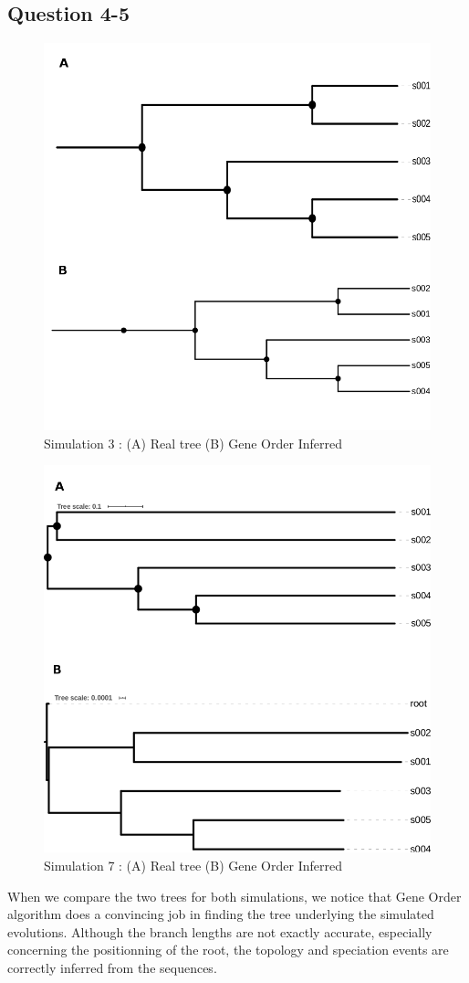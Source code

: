 \documentclass[]{article}
\theoremstyle{definition}
\begin{document}
\newpage
\subsection{Question 4-5}

\begin{figure}[h]
	\centering
	\includegraphics*[width = 0.5\linewidth]{image/new/tree3.png}
	\caption{ Simulation 3 :  (A) Real tree (B) Gene Order Inferred }
\end{figure}

\begin{figure}[h]
	\centering
	\includegraphics*[width = 0.5\linewidth]{image/new/tree7.png}
	\caption{ Simulation 7 :  (A) Real tree (B) Gene Order Inferred }
\end{figure}

When we compare the two trees for both simulations, we notice that Gene Order algorithm does a convincing job in finding the tree underlying the simulated evolutions. Although the branch lengths are not exactly accurate, especially concerning the positionning of the root, the topology and speciation events are correctly inferred from the sequences.
\end{document}
